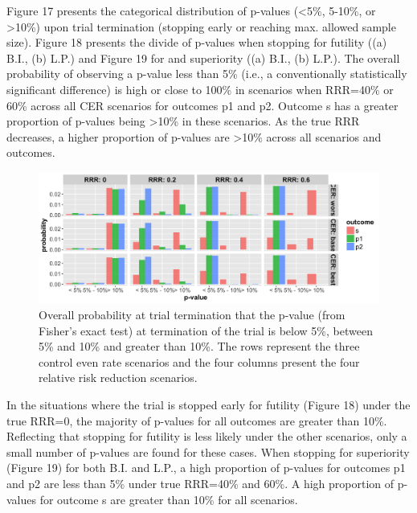 \documentclass[]{article}
\begin{document}
Figure 17 presents the categorical distribution of p-values
(\textless{}5\%, 5-10\%, or \textgreater{}10\%) upon trial termination
(stopping early or reaching max. allowed sample size). Figure 18
presents the divide of p-values when stopping for futility ((a) B.I.,
(b) L.P.) and Figure 19 for and superiority ((a) B.I., (b) L.P.). The
overall probability of observing a p-value less than 5\% (i.e., a
conventionally statistically significant difference) is high or close to
100\% in scenarios when RRR=40\% or 60\% across all CER scenarios for
outcomes p1 and p2. Outcome s has a greater proportion of p-values being
\textgreater{}10\% in these scenarios. As the true RRR decreases, a
higher proportion of p-values are \textgreater{}10\% across all
scenarios and outcomes.

\begin{figure}
  \caption{Overall probability at trial termination that the p-value (from Fisher’s exact test) at termination of the
  trial is below 5\%, between 5\% and 10\% and greater than 10\%. The rows represent the three control even rate
  scenarios and the four columns present the four relative risk reduction scenarios.}
  \includegraphics{../plots/3arm/p_value_3arm.png}
\end{figure}

In the situations where the trial is stopped early for futility (Figure
18) under the true RRR=0, the majority of p-values for all outcomes are
greater than 10\%. Reflecting that stopping for futility is less likely
under the other scenarios, only a small number of p-values are found for
these cases. When stopping for superiority (Figure 19) for both B.I. and
L.P., a high proportion of p-values for outcomes p1 and p2 are less than
5\% under true RRR=40\% and 60\%. A high proportion of p-values for
outcome s are greater than 10\% for all scenarios.
\end{document}

